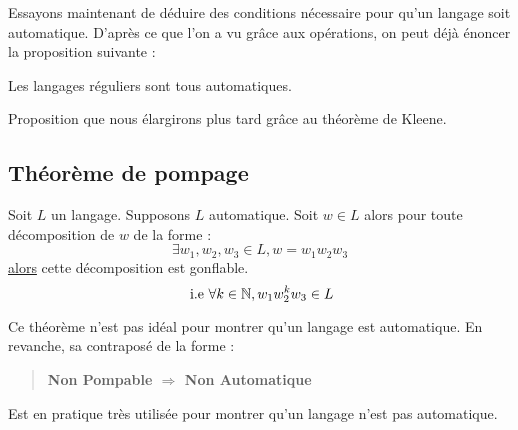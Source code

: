 Essayons maintenant de déduire des conditions nécessaire pour qu'un langage soit automatique. 
D'après ce que l'on a vu grâce aux opérations, on peut déjà énoncer la proposition suivante : 
\begin{proposition}
    Les langages réguliers sont tous automatiques. 
\end{proposition}

Proposition que nous élargirons plus tard grâce au théorème de Kleene. 

\subsection{Théorème de pompage}

\begin{theorem}
    Soit $L$ un langage. Supposons $L$ automatique. Soit $w \in L$ alors pour toute décomposition de $w$ de la forme :
        \[\exists w_1, w_2, w_3 \in L, w = w_1 w_2 w_3 \]
    \underline{alors} cette décomposition est gonflable. 
        \[ \text{ i.e } \forall k \in \mathbb{N}, w_1 w_2 ^k w_3 \in L \]
\end{theorem} 

Ce théorème n'est pas idéal pour montrer qu'un langage est automatique. En revanche, sa contraposé de la forme :
\begin{quote}
    \textbf{Non Pompable $ \Longrightarrow $ Non Automatique}
\end{quote}

Est en pratique très utilisée pour montrer qu'un langage n'est pas automatique. 